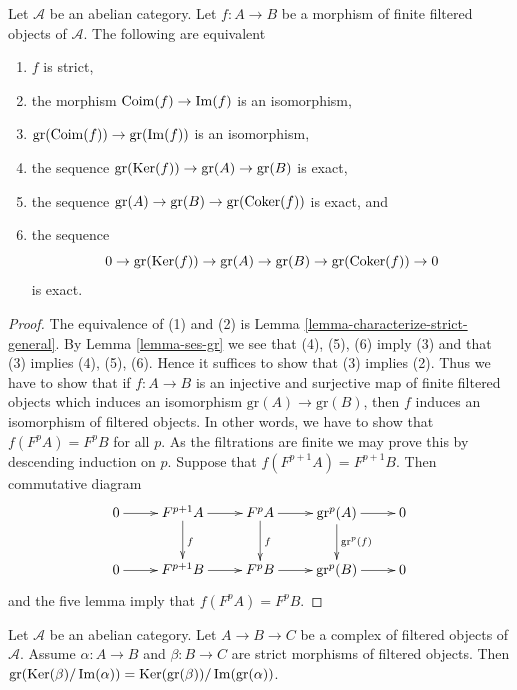 \begin{lemma}
\label{lemma-characterize-strict}
Let $\mathcal{A}$ be an abelian category.
Let $f : A \to B$ be a morphism of finite
filtered objects of $\mathcal{A}$. The following are equivalent
\begin{enumerate}
\item $f$ is strict,
\item the morphism $\mathop{\mathrm{Coim}}(f) \to \mathop{\mathrm{Im}}(f)$ is an isomorphism,
\item $\text{gr}(\mathop{\mathrm{Coim}}(f)) \to \text{gr}(\mathop{\mathrm{Im}}(f))$ is an
isomorphism,
\item the sequence
$\text{gr}(\mathop{\mathrm{Ker}}(f)) \to \text{gr}(A) \to \text{gr}(B)$
is exact,
\item the sequence $\text{gr}(A) \to \text{gr}(B) \to
\text{gr}(\mathop{\mathrm{Coker}}(f))$ is exact, and
\item the sequence
$$
0 \to
\text{gr}(\mathop{\mathrm{Ker}}(f)) \to
\text{gr}(A) \to
\text{gr}(B) \to
\text{gr}(\mathop{\mathrm{Coker}}(f)) \to 0
$$
is exact.
\end{enumerate}
\end{lemma}

\begin{proof}
The equivalence of (1) and (2) is
Lemma \ref{lemma-characterize-strict-general}.
By
Lemma \ref{lemma-ses-gr}
we see that (4), (5), (6) imply (3) and that (3) implies (4), (5), (6).
Hence it suffices to show that (3) implies (2).
Thus we have to show that if $f : A \to B$ is an injective and surjective
map of finite filtered objects which induces an isomorphism
$\text{gr}(A) \to \text{gr}(B)$, then $f$ induces an isomorphism of
filtered objects. In other words, we have to show that
$f(F^pA) = F^pB$ for all $p$.
As the filtrations are finite we may prove this by descending induction
on $p$. Suppose that $f(F^{p + 1}A) = F^{p + 1}B$.
Then commutative diagram
$$
\xymatrix{
0 \ar[r] &
F^{p + 1}A \ar[r] \ar[d]^f &
F^pA \ar[r] \ar[d]^f &
\text{gr}^p(A) \ar[r] \ar[d]^{\text{gr}^p(f)} &
0 \\
0 \ar[r] &
F^{p + 1}B \ar[r] &
F^pB \ar[r] &
\text{gr}^p(B) \ar[r] &
0
}
$$
and the five lemma imply that $f(F^pA) = F^pB$.
\end{proof}

\begin{lemma}
\label{lemma-filtered-complex}
Let $\mathcal{A}$ be an abelian category. Let $A \to B \to C$ be a complex
of filtered objects of $\mathcal{A}$. Assume $\alpha : A \to B$ and
$\beta : B \to C$ are strict morphisms of filtered objects. Then
$\text{gr}(\mathop{\mathrm{Ker}}(\beta)/\mathop{\mathrm{Im}}(\alpha)) =
\mathop{\mathrm{Ker}}(\text{gr}(\beta))/\mathop{\mathrm{Im}}(\text{gr}(\alpha))$.
\end{lemma}

